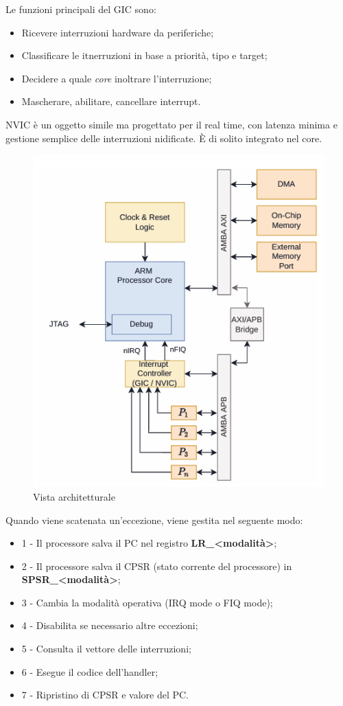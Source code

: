 Le funzioni principali del GIC sono:
\begin{itemize}
    \item Ricevere interruzioni hardware da periferiche;
    \item Classificare le itnerruzioni in base a priorità, tipo  e target;
    \item Decidere a quale \textit{core} inoltrare l'interruzione;
    \item Mascherare, abilitare, cancellare interrupt.
\end{itemize}

NVIC è un oggetto simile ma progettato per il real time, con latenza minima e gestione semplice delle interruzioni nidificate. \uppercase{è} di solito integrato nel core. 

\begin{figure}[ht]
    \centering
    \includegraphics[width=.5\textwidth]{img/arm_eccezioni_arch.png}
    \caption{Vista architetturale}
    \label{img:arm_eccezioni}
\end{figure}

Quando viene scatenata un'eccezione, viene gestita nel seguente modo:
\begin{itemize}
    \item 1 - Il processore salva il PC nel registro \textbf{LR\_<modalità>};
    \item 2 - Il processore salva il CPSR (stato corrente del processore) in \\ \textbf{SPSR\_<modalità>};
    \item 3 - Cambia la modalità operativa (IRQ mode o FIQ mode);
    \item 4 - Disabilita se necessario altre eccezioni;
    \item 5 - Consulta il vettore delle interruzioni;
    \item 6 - Esegue il codice dell'handler;
    \item 7 - Ripristino di CPSR e valore del PC.
\end{itemize}

